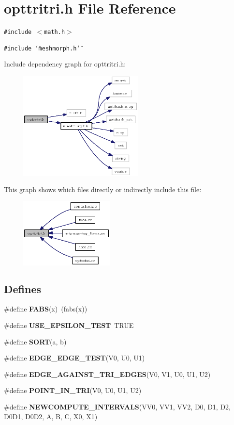 \section{opttritri.h File Reference}
\label{opttritri_8h}
{\tt \#include $<$math.h$>$}\par
{\tt \#include \char`\"{}meshmorph.h\char`\"{}}\par


Include dependency graph for opttritri.h:\begin{figure}[H]
\begin{center}
\leavevmode
\includegraphics[width=178pt]{opttritri_8h__incl}
\end{center}
\end{figure}


This graph shows which files directly or indirectly include this file:\begin{figure}[H]
\begin{center}
\leavevmode
\includegraphics[width=134pt]{opttritri_8h__dep__incl}
\end{center}
\end{figure}
\subsection*{Defines}
\begin{CompactItemize}
\item 
\#define {\bf FABS}(x)~(fabs(x))
\item 
\#define {\bf USE\_\-EPSILON\_\-TEST}~TRUE
\item 
\#define {\bf SORT}(a, b)
\item 
\#define {\bf EDGE\_\-EDGE\_\-TEST}(V0, U0, U1)
\item 
\#define {\bf EDGE\_\-AGAINST\_\-TRI\_\-EDGES}(V0, V1, U0, U1, U2)
\item 
\#define {\bf POINT\_\-IN\_\-TRI}(V0, U0, U1, U2)
\item 
\#define {\bf NEWCOMPUTE\_\-INTERVALS}(VV0, VV1, VV2, D0, D1, D2, D0D1, D0D2, A, B, C, X0, X1)
\end{CompactItemize}
